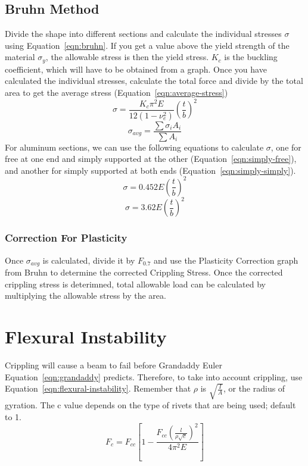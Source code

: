 \documentclass{article}
\begin{document}
\subsection{Bruhn Method}
Divide the shape into different sections and calculate the individual stresses $\sigma$ using Equation~\ref{eqn:bruhn}.
If you get a value above the yield strength of the material $\sigma_y$, the allowable stress is then the yield stress.
$K_c$ is the buckling coefficient, which will have to be obtained from a graph.
Once you have calculated the individual stresses, calculate the total force and divide by the total area to get the average stress (Equation~\ref{eqn:average-stress})
\begin{equation}\label{eqn:bruhn}
    \sigma = \frac{K_c \pi ^ 2 E}{12(1 - \nu_e ^ 2)}\left(\frac{t}{b}\right) ^ 2
\end{equation}
\begin{equation}\label{eqn:average-stress}
    \sigma_{avg} = \frac{\sum\sigma_i A_i}{\sum A_i}
\end{equation}
For aluminum sections, we can use the following equations to calculate $\sigma$, one for free at one end and simply supported at the other (Equation~\ref{eqn:simply-free}), and another for simply supported at both ends (Equation~\ref{eqn:simply-simply}).
\begin{equation}\label{eqn:simply-free}
   \sigma = 0.452E\left(\frac{t}{b}\right) ^ 2
\end{equation}
\begin{equation}\label{eqn:simply-simply}
    \sigma = 3.62E\left(\frac{t}{b}\right) ^ 2
\end{equation}
\subsubsection{Correction For Plasticity}
Once $\sigma_{avg}$ is calculated, divide it by $F_{0.7}$ and use the Plasticity Correction graph from Bruhn to determine the corrected Crippling Stress.
Once the corrected crippling stress is deterimned, total allowable load can be calculated by multiplying the allowable stress by the area.
\section{Flexural Instability}
Crippling will cause a beam to fail before Grandaddy Euler Equation~\ref{eqn:grandaddy} predicts.
Therefore, to take into account crippling, use Equation~\ref{eqn:flexural-instability}.
Remember that $\rho$ is $\sqrt{\frac{I}{A}}$, or the radius of gyration.
The c value depends on the type of rivets that are being used; default to 1.
\begin{equation}\label{eqn:flexural-instability}
    F_c = F_{cc}\left[1 - \frac{F_{cc} \left(\frac{l}{\rho \sqrt{c}}\right) ^ 2}{4\pi ^2 E}\right]
\end{equation}
\end{document}
